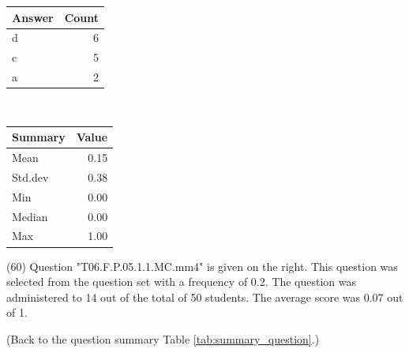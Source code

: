 \documentclass[12pt,english,nohyper]{tufte-handout}\usepackage[]{graphicx}\usepackage[]{color}
\begin{document}
\begin{center}%
\begin{tabular}{lr}
  \hline
Answer & Count \\ 
  \hline
d &   6 \\ 
  c &   5 \\ 
  a &   2 \\ 
   \hline
\end{tabular}
~~~~~~~~%
\begin{tabular}{lr}
  \hline
Summary & Value \\ 
  \hline
Mean & 0.15 \\ 
  Std.dev & 0.38 \\ 
  Min & 0.00 \\ 
  Median & 0.00 \\ 
  Max & 1.00 \\ 
   \hline
\end{tabular}
\end{center}\newpage{} (60) Question "T06.F.P.05.1.1.MC.mm4" is given on the right. This question was selected from the question set with a frequency of 0.2. The question was administered to 14 out of the total of 50 students. The average score was 0.07 out of 1.

 (Back to the question summary Table \ref{tab:summary_question}.)
\end{document}
